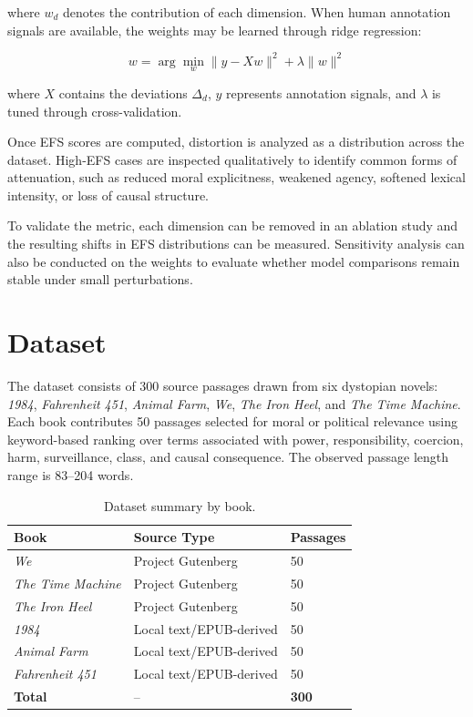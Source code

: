 \documentclass[10pt, conference]{IEEEtran}
\begin{document}
where $w_d$ denotes the contribution of each dimension. When human annotation signals are available, the weights may be learned through ridge regression:

\[
w = \arg\min_w \|y - Xw\|^2 + \lambda \|w\|^2
\]

where $X$ contains the deviations $\Delta_d$, $y$ represents annotation signals, and $\lambda$ is tuned through cross-validation.

Once EFS scores are computed, distortion is analyzed as a distribution across the dataset. High-EFS cases are inspected qualitatively to identify common forms of attenuation, such as reduced moral explicitness, weakened agency, softened lexical intensity, or loss of causal structure.

To validate the metric, each dimension can be removed in an ablation study and the resulting shifts in EFS distributions can be measured. Sensitivity analysis can also be conducted on the weights to evaluate whether model comparisons remain stable under small perturbations.

\section{Dataset} \label{sec:dataset}

The dataset consists of 300 source passages drawn from six dystopian novels: \textit{1984}, \textit{Fahrenheit 451}, \textit{Animal Farm}, \textit{We}, \textit{The Iron Heel}, and \textit{The Time Machine}. Each book contributes 50 passages selected for moral or political relevance using keyword-based ranking over terms associated with power, responsibility, coercion, harm, surveillance, class, and causal consequence. The observed passage length range is 83--204 words.

\begin{table}[h]
\centering
\caption{Dataset summary by book.}
\label{tab:dataset_summary}
\scriptsize
\begin{tabular}{lll}
\toprule
\textbf{Book} & \textbf{Source Type} & \textbf{Passages} \\
\midrule
\textit{We} & Project Gutenberg & 50 \\
\textit{The Time Machine} & Project Gutenberg & 50 \\
\textit{The Iron Heel} & Project Gutenberg & 50 \\
\textit{1984} & Local text/EPUB-derived & 50 \\
\textit{Animal Farm} & Local text/EPUB-derived & 50 \\
\textit{Fahrenheit 451} & Local text/EPUB-derived & 50 \\
\midrule
\textbf{Total} & -- & \textbf{300} \\
\bottomrule
\end{tabular}
\end{table}
\end{document}
